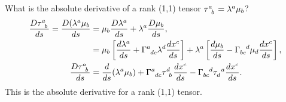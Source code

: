 \documentclass[a4paper, 11pt, normalem]{report}
\begin{document}
What is the absolute derivative of a rank (1,1) tensor $\tensor{\tau}{^a_b}=\lambda^a\mu_b$?
\begin{align}
    \frac{D\tensor{\tau}{^a_b}}{ds} = \frac{D(\lambda^a\mu_b}{ds} &= \mu_b\frac{D\lambda^a}{ds} + \lambda^a\frac{D\mu_b}{ds}, \\
                                                                  &= \mu_b\left[\frac{d\lambda^a}{ds}+\tensor{\Gamma}{^a_{dc}}\lambda^d\frac{dx^c}{ds}\right] + \lambda^a\left[\frac{d\mu_b}{ds}-\tensor{\Gamma}{_{bc}^d}\mu_d\frac{dx^c}{ds}\right],\\
    \frac{D\tensor{\tau}{^a_b}}{ds} &= \frac{d}{ds}(\lambda^a\mu_b) + \tensor{\Gamma}{^a_{dc}}\tensor{\tau}{^d_b}\frac{dx^c}{ds} - \tensor{\Gamma}{_{bc}^d}\tensor{\tau}{_d^a}\frac{dx^c}{ds}.
\end{align}
This is the absolute derivative for a rank (1,1) tensor.
\end{document}

